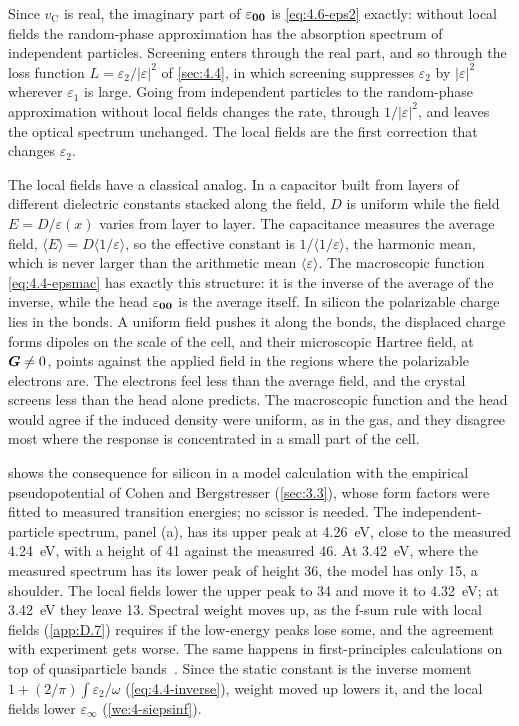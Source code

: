 Since $v_{\mathrm{C}}$ is real, the imaginary part of $\varepsilon_{\bm{0}\bm{0}}$ is \cref{eq:4.6-eps2} exactly: without local fields the random-phase approximation has the absorption spectrum of independent particles. Screening enters through the real part, and so through the loss function $L = \varepsilon_2/|\varepsilon|^2$ of \cref{sec:4.4}, in which screening suppresses $\varepsilon_2$ by $|\varepsilon|^2$ wherever $\varepsilon_1$ is large. Going from independent particles to the random-phase approximation without local fields changes the rate, through $1/|\varepsilon|^2$, and leaves the optical spectrum unchanged. The local fields are the first correction that changes $\varepsilon_2$.

The local fields have a classical analog. In a capacitor built from layers of different dielectric constants stacked along the field, $D$ is uniform while the field $E = D/\varepsilon(x)$ varies from layer to layer. The capacitance measures the average field, $\langle E\rangle = D\langle1/\varepsilon\rangle$, so the effective constant is $1/\langle1/\varepsilon\rangle$, the harmonic mean, which is never larger than the arithmetic mean $\langle\varepsilon\rangle$. The macroscopic function \cref{eq:4.4-epsmac} has exactly this structure: it is the inverse of the average of the inverse, while the head $\varepsilon_{\bm{0}\bm{0}}$ is the average itself. In silicon the polarizable charge lies in the bonds. A uniform field pushes it along the bonds, the displaced charge forms dipoles on the scale of the cell, and their microscopic Hartree field, at $\bm{G} \neq 0$, points against the applied field in the regions where the polarizable electrons are. The electrons feel less than the average field, and the crystal screens less than the head alone predicts. The macroscopic function and the head would agree if the induced density were uniform, as in the gas, and they disagree most where the response is concentrated in a small part of the cell.

 shows the consequence for silicon in a model calculation with the empirical pseudopotential of Cohen and Bergstresser (\cref{sec:3.3}), whose form factors were fitted to measured transition energies; no scissor is needed. The independent-particle spectrum, panel (a), has its upper peak at \SI{4.26}{eV}, close to the measured \SI{4.24}{eV}, with a height of 41 against the measured 46. At \SI{3.42}{eV}, where the measured spectrum has its lower peak of height 36, the model has only 15, a shoulder. The local fields lower the upper peak to 34 and move it to \SI{4.32}{eV}; at \SI{3.42}{eV} they leave 13. Spectral weight moves up, as the f-sum rule with local fields (\cref{app:D.7}) requires if the low-energy peaks lose some, and the agreement with experiment gets worse. The same happens in first-principles calculations on top of quasiparticle bands~\cite{albrecht1998ab}. Since the static constant is the inverse moment $1 + (2/\pi)\int\varepsilon_2/\omega$ (\cref{eq:4.4-inverse}), weight moved up lowers it, and the local fields lower $\varepsilon_\infty$ (\cref{we:4-siepsinf}).


